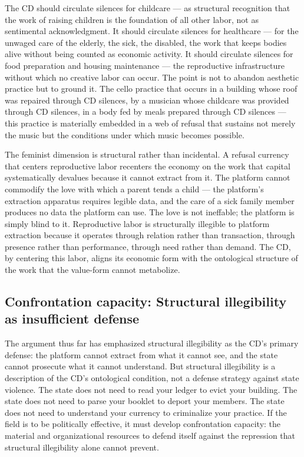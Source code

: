 The CD should circulate silences for childcare — as structural recognition that the work of raising children is the foundation of all other labor, not as sentimental acknowledgment. It should circulate silences for healthcare — for the unwaged care of the elderly, the sick, the disabled, the work that keeps bodies alive without being counted as economic activity. It should circulate silences for food preparation and housing maintenance — the reproductive infrastructure without which no creative labor can occur. The point is not to abandon aesthetic practice but to ground it. The cello practice that occurs in a building whose roof was repaired through CD silences, by a musician whose childcare was provided through CD silences, in a body fed by meals prepared through CD silences — this practice is materially embedded in a web of refusal that sustains not merely the music but the conditions under which music becomes possible.

The feminist dimension is structural rather than incidental. A refusal currency that centers reproductive labor recenters the economy on the work that capital systematically devalues because it cannot extract from it. The platform cannot commodify the love with which a parent tends a child — the platform's extraction apparatus requires legible data, and the care of a sick family member produces no data the platform can use. The love is not ineffable; the platform is simply blind to it. Reproductive labor is structurally illegible to platform extraction because it operates through relation rather than transaction, through presence rather than performance, through need rather than demand. The CD, by centering this labor, aligns its economic form with the ontological structure of the work that the value-form cannot metabolize.

\subsection{Confrontation capacity: Structural illegibility as insufficient defense}

The argument thus far has emphasized structural illegibility as the CD's primary defense: the platform cannot extract from what it cannot see, and the state cannot prosecute what it cannot understand. But structural illegibility is a description of the CD's ontological condition, not a defense strategy against state violence. The state does not need to read your ledger to evict your building. The state does not need to parse your booklet to deport your members. The state does not need to understand your currency to criminalize your practice. If the field is to be politically effective, it must develop confrontation capacity: the material and organizational resources to defend itself against the repression that structural illegibility alone cannot prevent.

